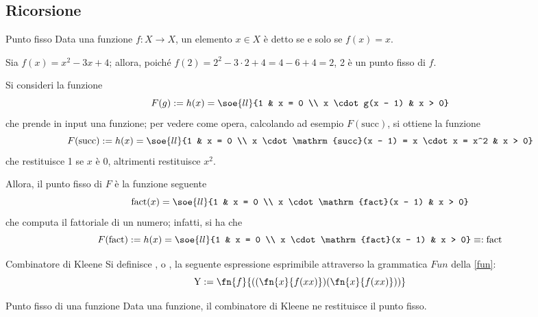 \documentclass[a4paper, 12pt]{report}
\begin{document}
    \subsection{Ricorsione}

    \begin{frameddefn}{Punto fisso}
        Data una funzione $f: X \to X$, un elemento $x \in X$ è detto  se e solo se $f(x) = x$.
    \end{frameddefn}

    \begin{example}
        Sia $f(x) = x^2 -3x +4$; allora, poiché $f(2) = 2^2 - 3 \cdot 2 + 4 = 4 - 6 + 4 = 2$, 2 è un punto fisso di $f$.
    \end{example}

    \begin{example}
        \label{fn fixed points}
        Si consideri la funzione $$F(g) := h(x) = \soe{ll}{1 & x = 0 \\ x \cdot g(x - 1) & x > 0}$$ che prende in input una funzione; per vedere come opera, calcolando ad esempio $F(\mathrm{succ})$, si ottiene la funzione $$F(\mathrm{succ}) := h(x) = \soe{ll}{1 & x = 0 \\ x \cdot \mathrm{succ}(x - 1) = x \cdot x = x^2 & x > 0}$$ che restituisce 1 se $x$ è 0, altrimenti restituisce $x^2$.

        Allora, il punto fisso di $F$ è la funzione seguente $$\mathrm{fact}(x) = \soe{ll}{1 & x = 0 \\ x \cdot \mathrm{fact}(x - 1) & x > 0}$$ che computa il fattoriale di un numero; infatti, si ha che $$F(\mathrm{fact}) := h(x) = \soe{ll}{1 & x = 0 \\ x \cdot \mathrm{fact}(x - 1) & x > 0} \equiv : \mathrm{fact}$$
    \end{example}

    \begin{frameddefn}{Combinatore di Kleene}
        Si definisce , o , la seguente espressione esprimibile attraverso la grammatica $Fun$ della \cref{fun}: $$\mathrm Y := \fn{f}{((\fn{x}{f(xx)})(\fn{x}{f(xx)}))}$$
    \end{frameddefn}

    \begin{framedprop}{Punto fisso di una funzione}
        Data una funzione, il combinatore di Kleene ne restituisce il punto fisso.
    \end{framedprop}
\end{document}
